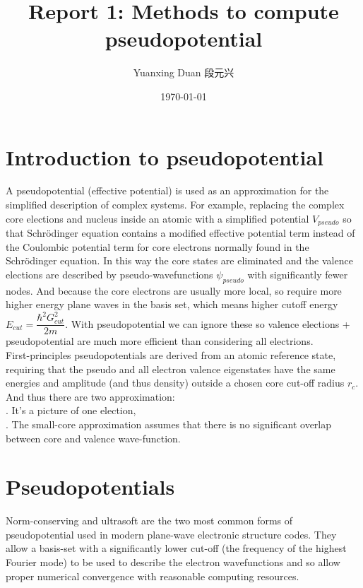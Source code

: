 \documentclass[UTF8]{ctexart}
\title{Report 1: Methods to compute pseudopotential}
\author{Yuanxing Duan 段元兴}
\date{\today}
\begin{document}
\maketitle
\thispagestyle{empty}
\setcounter{page}{1}
\newpage
\tableofcontents
\newpage
    \section{Introduction to pseudopotential}
        \indent A pseudopotential (effective potential) is used as an approximation for the
        simplified description of complex systems. For example, replacing the complex core elections
        and nucleus inside an atomic with a simplified potential $V_{pseudo}$ so that Schrödinger
        equation contains a modified effective potential term instead of the Coulombic potential
        term for core electrons normally found in the Schrödinger equation. In this way the core
        states are eliminated and the valence elections are described by pseudo-wavefunctions $\psi_{pseudo}$
        with significantly fewer nodes. And because the core electrons are usually more local, so require more
        higher energy plane waves in the basis set, which means higher cutoff energy $E_{cut}=\dfrac{\hbar^2G_{cut}^2}{2m}$.
        With pseudopotential we can ignore these so valence elections + pseudopotential are much more efficient than
        considering all electrions.\\
        First-principles pseudopotentials are derived from an atomic reference state, requiring that the pseudo and all
        electron valence eigenstates have the same energies and amplitude (and thus density) outside a chosen core cut-off
        radius $r_c$. And thus there are two approximation:\\
        . It's a picture of one election,\\
        . The small-core approximation assumes that there is no significant overlap between core and valence wave-function.\\
    \section{Pseudopotentials}
        \indent Norm-conserving and ultrasoft are the two most common forms of pseudopotential used in modern plane-wave electronic
        structure codes. They allow a basis-set with a significantly lower cut-off (the frequency of the highest Fourier mode) to be
        used to describe the electron wavefunctions and so allow proper numerical convergence with reasonable computing resources.
\end{document}
